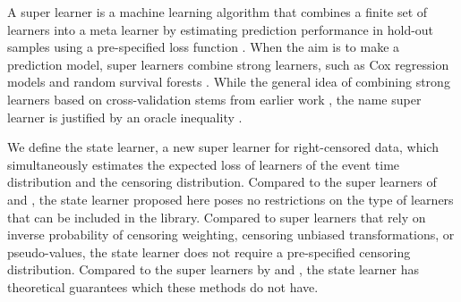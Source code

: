 \documentclass[11pt]{article}
\theoremstyle{thmstyleone}%
\theoremstyle{thmstyletwo}%
\theoremstyle{thmstylethree}%
\newcommand{\1}{\mathds{1}}
\begin{document}
A super learner is a machine learning algorithm that combines a finite
set of learners into a meta learner by estimating prediction
performance in hold-out samples using a pre-specified loss function
\citep{van2007super}. When the aim is to make a prediction model,
super learners combine strong learners, such as Cox regression models
and random survival forests \citep[][Section 8.4]{gerds2021medical}.
While the general idea of combining strong learners based on cross-validation
stems from earlier work \citep{wolpert1992stacked,breiman1996stacked}, the
name super learner is justified by an oracle inequality
\citep{van2003unicv,vaart2006oracle}.

We define the state learner, a new super learner for right-censored data, which
simultaneously estimates the expected loss of learners of the event time
distribution and the censoring distribution. Compared to the super learners of
\cite{polley2011-sl-cens} and \cite{golmakani2020super}, the state learner
proposed here poses no restrictions on the type of learners that can be included
in the library. Compared to super learners that rely on inverse probability of
censoring weighting, censoring unbiased transformations, or pseudo-values, the
state learner does not require a pre-specified censoring distribution. Compared
to the super learners by \cite{han2021inverse} and \cite{westling2021inference},
the state learner has theoretical guarantees which these methods do not have.
\end{document}
